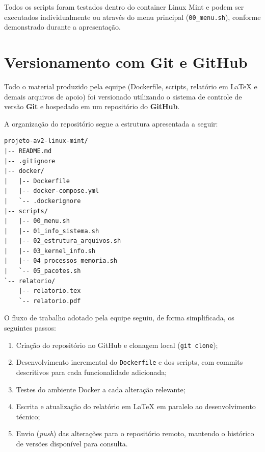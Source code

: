\documentclass[a4paper,12pt]{article}
\begin{document}
Todos os scripts foram testados dentro do container Linux Mint e podem ser
executados individualmente ou através do menu principal
(\texttt{00\_menu.sh}), conforme demonstrado durante a apresentação.


\section{Versionamento com Git e GitHub}

Todo o material produzido pela equipe (Dockerfile, scripts, relatório em
\LaTeX{} e demais arquivos de apoio) foi versionado utilizando o sistema de
controle de versão \textbf{Git} e hospedado em um repositório do
\textbf{GitHub}.

A organização do repositório segue a estrutura apresentada a seguir:

\begin{lstlisting}[caption={Estrutura do repositório no GitHub}]
projeto-av2-linux-mint/
|-- README.md
|-- .gitignore
|-- docker/
|   |-- Dockerfile
|   |-- docker-compose.yml
|   `-- .dockerignore
|-- scripts/
|   |-- 00_menu.sh
|   |-- 01_info_sistema.sh
|   |-- 02_estrutura_arquivos.sh
|   |-- 03_kernel_info.sh
|   |-- 04_processos_memoria.sh
|   `-- 05_pacotes.sh
`-- relatorio/
    |-- relatorio.tex
    `-- relatorio.pdf
\end{lstlisting}

O fluxo de trabalho adotado pela equipe seguiu, de forma simplificada, os
seguintes passos:

\begin{enumerate}
    \item Criação do repositório no GitHub e clonagem local
          (\texttt{git clone});
    \item Desenvolvimento incremental do \texttt{Dockerfile} e dos
          scripts, com commits descritivos para cada funcionalidade
          adicionada;
    \item Testes do ambiente Docker a cada alteração relevante;
    \item Escrita e atualização do relatório em \LaTeX{} em paralelo ao
          desenvolvimento técnico;
    \item Envio (\textit{push}) das alterações para o repositório remoto,
          mantendo o histórico de versões disponível para consulta.
\end{enumerate}
\end{document}

